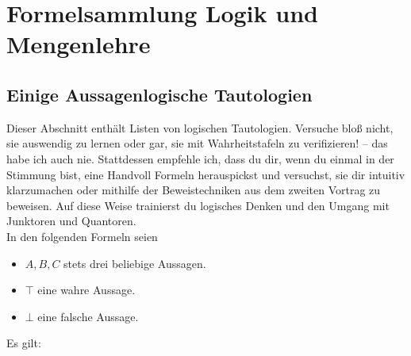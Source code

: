 

\chapter{Formelsammlung Logik und Mengenlehre} \label{formelsammlung}


\section{Einige Aussagenlogische Tautologien}
Dieser Abschnitt enthält Listen von logischen Tautologien. Versuche bloß nicht, sie auswendig zu lernen oder gar, sie mit Wahrheitstafeln zu verifizieren! -- das habe ich auch nie. Stattdessen empfehle ich, dass du dir, wenn du einmal in der Stimmung bist, eine Handvoll Formeln herauspickst und versuchst, sie dir intuitiv klarzumachen oder mithilfe der Beweistechniken aus dem zweiten Vortrag zu beweisen. Auf diese Weise trainierst du logisches Denken und den Umgang mit Junktoren und Quantoren. \\[0.5em]
In den folgenden Formeln seien
\begin{itemize}
    \item $A,B,C$ stets drei beliebige Aussagen.
    \item $\top$ eine wahre Aussage.
    \item $\bot$ eine falsche Aussage.
\end{itemize}
Es gilt:
\begingroup
\allowdisplaybreaks
